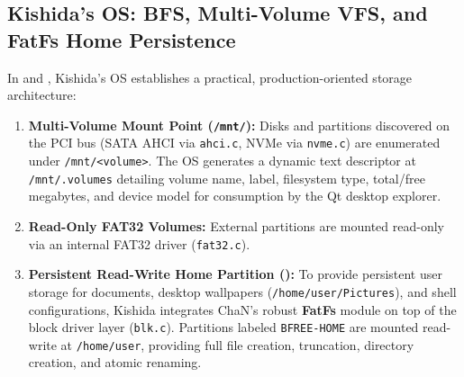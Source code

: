 \documentclass[10pt,journal,compsoc,twocolumn]{article}
\begin{document}
\subsection{Kishida's OS: BFS, Multi-Volume VFS, and FatFs Home Persistence}
In  and , Kishida's OS establishes a practical, production-oriented storage architecture:
\begin{enumerate}[leftmargin=*]
    \item \textbf{Multi-Volume Mount Point (\texttt{/mnt/}):} Disks and partitions discovered on the PCI bus (SATA AHCI via \texttt{ahci.c}, NVMe via \texttt{nvme.c}) are enumerated under \texttt{/mnt/<volume>}. The OS generates a dynamic text descriptor at \texttt{/mnt/.volumes} detailing volume name, label, filesystem type, total/free megabytes, and device model for consumption by the Qt desktop explorer.
    \item \textbf{Read-Only FAT32 Volumes:} External partitions are mounted read-only via an internal FAT32 driver (\texttt{fat32.c}).
    \item \textbf{Persistent Read-Write Home Partition ():} To provide persistent user storage for documents, desktop wallpapers (\texttt{/home/user/Pictures}), and shell configurations, Kishida integrates ChaN's robust \textbf{FatFs} module on top of the block driver layer (\texttt{blk.c}). Partitions labeled \texttt{BFREE-HOME} are mounted read-write at \texttt{/home/user}, providing full file creation, truncation, directory creation, and atomic renaming.
\end{enumerate}
\end{document}
